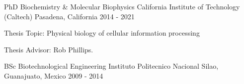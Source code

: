 

\begin{cventries}

  \cventry
    {PhD Biochemistry \& Molecular Biophysics} %
    {California Institute of Technology (Caltech)} %
    {Pasadena, California} %
    {2014 - 2021} %
    {
      \begin{cvitems} %
        \item {Thesis Topic: Physical biology of cellular information processing}
        \item {Thesis Advisor: Rob Phillips.}
      \end{cvitems}
    }

  \cventry
    {BSc Biotechnological Engineering} %
    {Instituto Politecnico Nacional} %
    {Silao, Guanajuato, Mexico} %
    {2009 - 2014} %
    {}
\end{cventries}